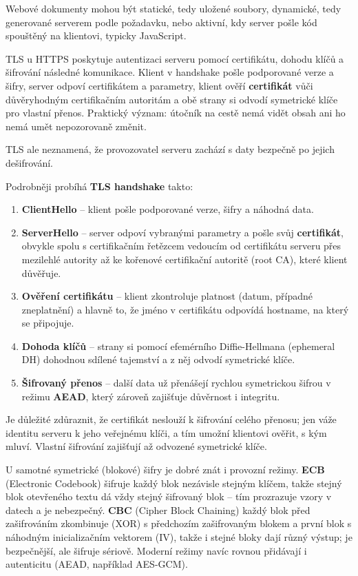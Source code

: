 Webové dokumenty mohou být statické, tedy uložené soubory, dynamické, tedy generované serverem podle požadavku, nebo aktivní, kdy server pošle kód spouštěný na klientovi, typicky JavaScript.

TLS u HTTPS poskytuje autentizaci serveru pomocí certifikátu, dohodu klíčů a šifrování následné komunikace. Klient v handshake pošle podporované verze a šifry, server odpoví certifikátem a parametry, klient ověří \textbf{certifikát} vůči důvěryhodným certifikačním autoritám a obě strany si odvodí symetrické klíče pro vlastní přenos. Praktický význam: útočník na cestě nemá vidět obsah ani ho nemá umět nepozorovaně změnit.

TLS ale neznamená, že provozovatel serveru zachází s daty bezpečně po jejich dešifrování.

Podrobněji probíhá \textbf{TLS handshake} takto:
\begin{enumerate}
  \item \textbf{ClientHello} -- klient pošle podporované verze, šifry a náhodná data.
  \item \textbf{ServerHello} -- server odpoví vybranými parametry a pošle svůj \textbf{certifikát}, obvykle spolu s certifikačním řetězcem vedoucím od certifikátu serveru přes mezilehlé autority až ke kořenové certifikační autoritě (root CA), které klient důvěřuje.
  \item \textbf{Ověření certifikátu} -- klient zkontroluje platnost (datum, případné zneplatnění) a hlavně to, že jméno v certifikátu odpovídá hostname, na který se připojuje.
  \item \textbf{Dohoda klíčů} -- strany si pomocí efemérního Diffie-Hellmana (ephemeral DH) dohodnou sdílené tajemství a z něj odvodí symetrické klíče.
  \item \textbf{Šifrovaný přenos} -- další data už přenášejí rychlou symetrickou šifrou v režimu \textbf{AEAD}, který zároveň zajišťuje důvěrnost i integritu.
\end{enumerate}

Je důležité zdůraznit, že certifikát neslouží k šifrování celého přenosu; jen váže identitu serveru k jeho veřejnému klíči, a tím umožní klientovi ověřit, s kým mluví. Vlastní šifrování zajišťují až odvozené symetrické klíče.

U samotné symetrické (blokové) šifry je dobré znát i provozní režimy. \textbf{ECB} (Electronic Codebook) šifruje každý blok nezávisle stejným klíčem, takže stejný blok otevřeného textu dá vždy stejný šifrovaný blok -- tím prozrazuje vzory v datech a je nebezpečný. \textbf{CBC} (Cipher Block Chaining) každý blok před zašifrováním zkombinuje (XOR) s předchozím zašifrovaným blokem a první blok s náhodným inicializačním vektorem (IV), takže i stejné bloky dají různý výstup; je bezpečnější, ale šifruje sériově. Moderní režimy navíc rovnou přidávají i autenticitu (AEAD, například AES-GCM).

